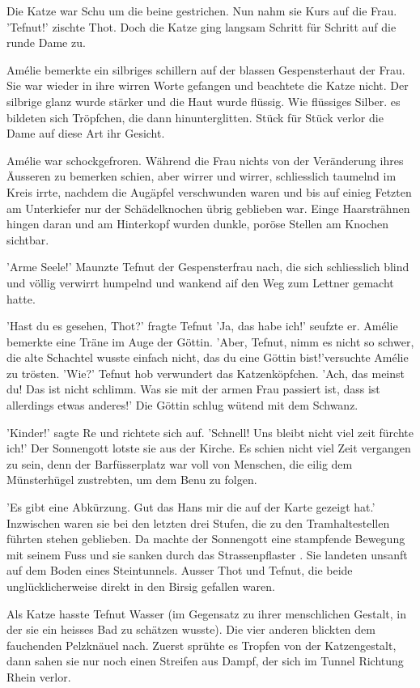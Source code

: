 \documentclass[11pt,titlepage,a5paper]{book}
\begin{document}
Die Katze war Schu um die beine gestrichen. Nun nahm sie Kurs auf die Frau. 'Tefnut!' zischte Thot. Doch die Katze ging langsam Schritt für Schritt auf die runde Dame zu.

Amélie bemerkte ein silbriges schillern auf der blassen Gespensterhaut der Frau. Sie war wieder in ihre wirren Worte gefangen und beachtete die Katze nicht. Der silbrige glanz wurde stärker und die Haut wurde flüssig. Wie flüssiges Silber. es bildeten sich Tröpfchen, die dann hinunterglitten. Stück für Stück verlor die Dame auf diese Art ihr Gesicht. 

Amélie war schockgefroren. Während die Frau nichts von der Veränderung ihres Äusseren zu bemerken schien, aber wirrer und wirrer, schliesslich taumelnd im Kreis irrte, nachdem die Augäpfel verschwunden waren und bis auf einieg Fetzten am Unterkiefer nur der Schädelknochen übrig geblieben war. Einge Haarsträhnen hingen daran und am Hinterkopf wurden dunkle, poröse Stellen am Knochen sichtbar.

'Arme Seele!' Maunzte Tefnut der Gespensterfrau nach, die sich schliesslich blind und völlig verwirrt humpelnd und wankend aif den Weg zum Lettner gemacht hatte.

'Hast du es gesehen, Thot?' fragte Tefnut 'Ja, das habe ich!' seufzte er. Amélie bemerkte eine Träne im Auge der Göttin. 'Aber, Tefnut, nimm es nicht so schwer, die alte Schachtel wusste einfach nicht, das du eine Göttin bist!'versuchte Amélie zu trösten. 'Wie?' Tefnut hob verwundert das Katzenköpfchen. 'Ach, das meinst du! Das ist nicht schlimm. Was sie mit der armen Frau passiert ist, dass ist allerdings etwas anderes!' Die Göttin schlug wütend mit dem Schwanz.

'Kinder!' sagte Re und richtete sich auf. 'Schnell! Uns bleibt nicht viel zeit fürchte ich!' Der Sonnengott lotste sie aus der Kirche. Es schien nicht viel Zeit vergangen zu sein, denn der Barfüsserplatz war voll von Menschen, die eilig dem Münsterhügel zustrebten, um dem Benu zu folgen.

'Es gibt eine Abkürzung. Gut das Hans mir die auf der Karte gezeigt hat.' Inzwischen waren sie bei den letzten drei Stufen, die zu den Tramhaltestellen führten stehen geblieben. Da machte der Sonnengott eine stampfende Bewegung mit seinem Fuss und sie sanken durch das Strassenpflaster . Sie landeten unsanft auf dem Boden eines Steintunnels. Ausser Thot und Tefnut, die beide unglücklicherweise direkt in den Birsig gefallen waren.

Als Katze hasste Tefnut Wasser (im Gegensatz zu ihrer menschlichen Gestalt, in der sie ein heisses Bad zu schätzen wusste). Die vier anderen blickten dem fauchenden Pelzknäuel nach. Zuerst sprühte es Tropfen von der Katzengestalt, dann sahen sie nur noch einen Streifen aus Dampf, der sich im Tunnel Richtung Rhein verlor.
\end{document}
